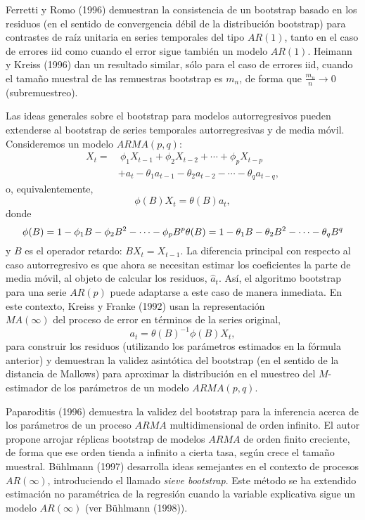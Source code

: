 \documentclass[
]{book}
\theoremstyle{definition}
\theoremstyle{definition}
\theoremstyle{definition}
\theoremstyle{remark}
\begin{document}
Ferretti y Romo (1996) demuestran la consistencia de un bootstrap basado
en los residuos (en el sentido de convergencia débil de la distribución
bootstrap) para contrastes de raíz unitaria en series temporales del
tipo \(AR(1)\), tanto en el caso de errores iid como cuando el error sigue
también un modelo \(AR(1)\). Heimann y Kreiss (1996) dan un resultado
similar, sólo para el caso de errores iid, cuando el tamaño muestral de
las remuestras bootstrap es \(m_n\), de forma que \(\frac{m_n}{n} \rightarrow 0\) (subremuestreo).

Las ideas generales sobre el bootstrap para modelos autorregresivos
pueden extenderse al bootstrap de series temporales autorregresivas y de
media móvil. Consideremos un modelo \(ARMA(p,q)\): \[\begin{aligned}
X_{t} =&\ \phi _1X_{t-1}+\phi _2X_{t-2}+\cdots +\phi _{p}X_{t-p} \\
&+a_{t}-\theta _1a_{t-1}-\theta _2a_{t-2}-\cdots -\theta _{q}a_{t-q},\end{aligned}\]o,
equivalentemente,
\[\phi (B)X_{t}=\theta (B)a_{t},\]
donde
\[\phi (B)=1-\phi _1B-\phi _2B^2-\cdots -\phi _{p}B^{p}\\ 
\theta(B)=1-\theta _1B-\theta _2B^2-\cdots -\theta _{q}B^{q}\]
y \(B\) es el operador retardo: \(BX_{t}=X_{t-1}\).
La diferencia principal con
respecto al caso autorregresivo es que ahora se necesitan estimar los
coeficientes la parte de media móvil, al objeto de calcular los
residuos, \(\widehat{a}_{t}\).
Así, el algoritmo bootstrap para una serie \(AR(p)\) puede
adaptarse a este caso de manera inmediata.
En este contexto, Kreiss y Franke (1992) usan la representación\\
\(MA(\infty )\) del proceso de error en términos de la series original,
\[a_{t}=\theta (B)^{-1}\phi(B) X_{t},\]
para construir los residuos
(utilizando los parámetros estimados en la fórmula anterior) y demuestran
la validez asintótica del bootstrap (en el sentido de la distancia de Mallows)
para aproximar la distribución en el muestreo del \(M\)-estimador de los
parámetros de un modelo \(ARMA(p,q)\).

Paparoditis (1996) demuestra la validez del bootstrap para la inferencia
acerca de los parámetros de un proceso \(ARMA\) multidimensional de orden
infinito. El autor propone arrojar réplicas bootstrap de modelos \(ARMA\)
de orden finito creciente, de forma que ese orden tienda a infinito a
cierta tasa, según crece el tamaño muestral. Bühlmann (1997) desarrolla
ideas semejantes en el contexto de procesos \(AR\left( \infty \right)\),
introduciendo el llamado \emph{sieve bootstrap}. Este método se ha extendido
estimación no paramétrica de la regresión cuando la variable explicativa
sigue un modelo \(AR\left( \infty \right)\) (ver Bühlmann (1998)).
\end{document}
